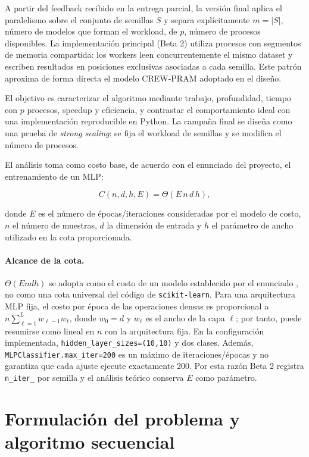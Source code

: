 \documentclass[11pt,a4paper]{article}
\newcommand{\Cost}{C}
\begin{document}
A partir del feedback recibido en la entrega parcial, la versión final aplica el
paralelismo sobre el conjunto de semillas $S$ y separa explícitamente
$m=|S|$, número de modelos que forman el workload, de $p$, número de procesos disponibles.
La implementación principal (Beta 2) utiliza procesos con segmentos de memoria compartida:
los workers leen concurrentemente el mismo dataset y escriben resultados en posiciones
exclusivas asociadas a cada semilla. Este patrón aproxima de forma directa el modelo
CREW-PRAM adoptado en el diseño.

El objetivo es caracterizar el algoritmo mediante trabajo, profundidad, tiempo con
$p$ procesos, speedup y eficiencia, y contrastar el comportamiento ideal con una
implementación reproducible en Python. La campaña final se diseña como una prueba de
\emph{strong scaling}: se fija el workload de semillas y se modifica 
el número de procesos.

El análisis toma como costo base, de acuerdo con el enunciado del proyecto, el
entrenamiento de un MLP:

\begin{equation}
    \Cost(n,d,h,E)=\Theta(E\,n\,d\,h),
    \label{eq:costo-modelo}
\end{equation}

donde $E$ es el número de épocas/iteraciones consideradas por el modelo de costo,
$n$ el número de muestras, $d$ la dimensión de entrada y $h$ el parámetro de ancho
utilizado en la cota proporcionada.

\paragraph{Alcance de la cota.}
$\Theta(E n d h)$ se adopta como el costo de un modelo establecido por el enunciado
\cite{fiestas2026proyecto},
no como una cota universal del código de \texttt{scikit-learn}. Para una arquitectura
MLP fija, el costo por época de las operaciones densas es proporcional a
$n\sum_{\ell=1}^{L} w_{\ell-1}w_\ell$, donde $w_0=d$ y $w_\ell$ es el ancho de la
capa $\ell$; por tanto, puede resumirse como lineal en $n$ con la arquitectura fija.
En la configuración implementada, \texttt{hidden\_layer\_sizes=(10,10)} y dos clases.
Además, \texttt{MLPClassifier.max\_iter=200} es un máximo de iteraciones/épocas y no
garantiza que cada ajuste ejecute exactamente 200. Por esta razón Beta 2 registra
\texttt{n\_iter\_} por semilla y el análisis teórico conserva $E$ como parámetro.

\section{Formulación del problema y algoritmo secuencial}
\end{document}
